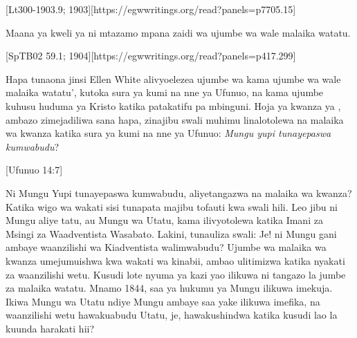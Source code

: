  \label{chap:remembering-the-beginning}

[Lt300-1903.9; 1903][https://egwwritings.org/read?panels=p7705.15]

Maana ya kweli ya  ni mtazamo mpana zaidi wa ujumbe wa wale malaika watatu.

[SpTB02 59.1; 1904][https://egwwritings.org/read?panels=p417.299]

Hapa tunaona jinsi Ellen White alivyoelezea ujumbe wa  kama ujumbe wa wale malaika watatu’, kutoka sura ya kumi na nne ya Ufunuo, na kama ujumbe kuhusu huduma ya Kristo katika patakatifu pa mbinguni. Hoja ya kwanza ya , ambazo zimejadiliwa sana hapa, zinajibu swali muhimu linalotolewa na malaika wa kwanza katika sura ya kumi na nne ya Ufunuo: \textit{Mungu yupi tunayepaswa kumwabudu}?

[Ufunuo 14:7]

Ni Mungu Yupi tunayepaswa kumwabudu, aliyetangazwa na malaika wa kwanza? Katika wigo wa wakati sisi tunapata majibu tofauti kwa swali hili. Leo jibu ni Mungu aliye tatu, au Mungu wa Utatu, kama ilivyotolewa katika Imani za Msingi za Waadventista Wasabato. Lakini, tunauliza swali: Je! ni Mungu gani ambaye waanzilishi wa Kiadventista walimwabudu? Ujumbe wa malaika wa kwanza umejumuishwa kwa wakati wa kinabii, ambao ulitimizwa katika nyakati za waanzilishi wetu. Kusudi lote nyuma ya kazi yao ilikuwa ni tangazo la jumbe za malaika watatu. Mnamo 1844, saa ya hukumu ya Mungu ilikuwa imekuja. Ikiwa Mungu wa Utatu ndiye Mungu ambaye saa yake ilikuwa imefika, na waanzilishi wetu hawakuabudu Utatu, je, hawakushindwa katika kusudi lao la kuunda harakati hii?

